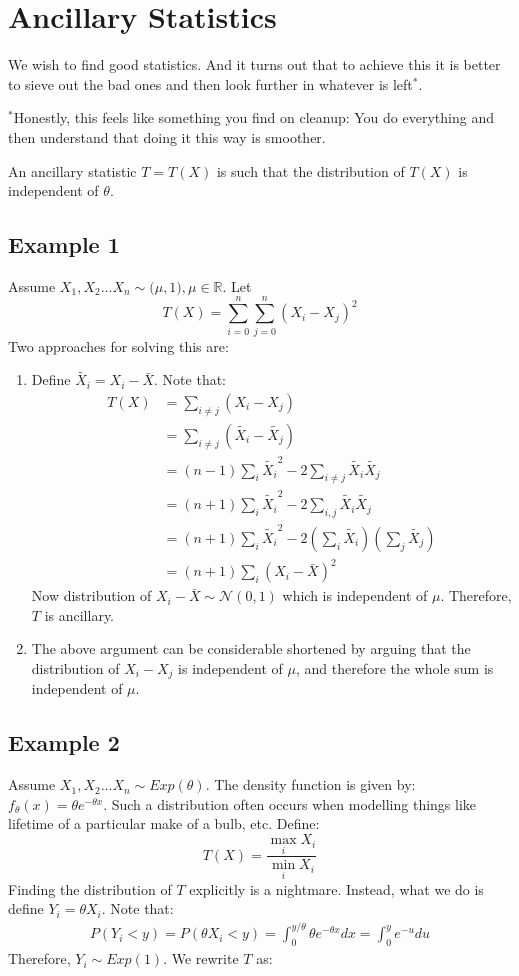 \documentclass[oneside]{book}
\begin{document}
\section{Ancillary Statistics}
We wish to find good statistics. And it turns out that to achieve this it is better to sieve out the bad ones and then look further in whatever is left$^*$.\\
\begin{marginfigure}%
    \footnotesize $^*$Honestly, this feels like something you find on cleanup: You do everything and then understand that doing it this way is smoother.
\end{marginfigure}%


An ancillary statistic $T=T(X)$ is such that the distribution of $T(X)$ is independent of $\theta$. 
\subsection{Example 1}
Assume $X_1,X_2\hdots X_n\sim\mathcal(\mu,1),\mu\in\mathbb R$. Let
$$T(X)=\sum_{i=0}^n\sum_{j=0}^n(X_i-X_j)^2$$ 
Two approaches for solving this are:
\begin{enumerate}
    \item Define $\tilde{X_i}=X_i-\bar X$. Note that:
        \begin{align*}
            T(X)&=\sum_{i\ne j}(X_i-X_j)\\
            &=\sum_{i\ne j}(\tilde{X_i}-\tilde{X_j})\\
            &=(n-1)\sum_{i}\tilde{X_i}^2-2\sum_{i\ne j}\tilde{X_i}\tilde{X_j}\\
            &=(n+1)\sum_{i}\tilde{X_i}^2-2\sum_{i,j}\tilde{X_i}\tilde{X_j}\\
            &=(n+1)\sum_{i}\tilde{X_i}^2-2\left(\sum_{i}\tilde{X_i}\right)\left(\sum_{j}\tilde{X_j}\right)\\
            &=(n+1)\sum_{i}\left(X_i-\bar X\right)^2
        \end{align*}
        Now distribution of $X_i-\bar X\sim\mathcal N(0,1)$ which is independent of $\mu$. Therefore, $T$ is ancillary.
    \item The above argument can be considerable shortened by arguing that the distribution of $X_i-X_j$ is independent of $\mu$, and therefore the whole sum is independent of $\mu$.
\end{enumerate}
\subsection{Example 2}
Assume $X_1,X_2\hdots X_n\sim Exp(\theta)$. The density function is given by: $f_\theta(x)=\theta e^{-\theta x}$. Such a distribution often occurs when modelling things like lifetime of a particular make of a bulb, etc. Define:
$$T(X)=\frac{\max_i X_i}{\min_i X_i}$$
Finding the distribution of $T$ explicitly is a nightmare. Instead, what we do is define $Y_i=\theta X_i$. Note that:
\begin{align*}
    P(Y_i<y)=P(\theta X_i<y)=\int_0^{y/\theta}\theta e^{-\theta x}dx=\int_0^ye^{-u}du
\end{align*}
Therefore, $Y_i\sim Exp(1)$. We rewrite $T$ as:
\end{document}
